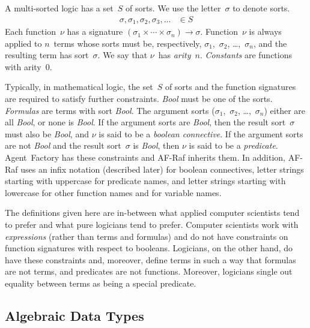 \documentclass[a4paper,12pt,oneside,fleqn]{book} %
\newcommand{\rg}[1]{\marginpar{\tiny\raggedright\textcolor{blue}{\bf rg:} #1}}
\begin{document}
A multi-sorted logic has a set~$S$ of sorts.  We use the letter~$\sigma$ to
denote sorts.
\begin{align}
\sigma, \sigma_1, \sigma_2, \sigma_3, \ldots &\in S
\end{align}
Each function~$\nu$ has a signature
$(\sigma_1\times\cdots\times\sigma_n)\to\sigma$.  Function~$\nu$ is always
applied to $n$~terms whose sorts must be, respectively,
$\sigma_1$,~$\sigma_2$, \dots,~$\sigma_n$, and the resulting term has
sort~$\sigma$. We say that $\nu$~has \emph{arity}~$n$. \emph{Constants} are
functions with arity~$0$.

Typically, in mathematical logic, the set~$S$ of sorts and the function
signatures are required to satisfy further constraints. \textit{Bool} must
be one of the sorts. \emph{Formulas} are terms with sort \textit{Bool}.
The argument sorts ($\sigma_1$,~$\sigma_2$, \dots,~$\sigma_n$) either are
all \textit{Bool}, or none is \textit{Bool}.  If the argument sorts are
\textit{Bool}, then the result sort~$\sigma$ must also be \textit{Bool},
and $\nu$ is said to be a \emph{boolean connective}.  If the argument sorts
are not \textit{Bool} and the result sort~$\sigma$ is \textit{Bool}, then
$\nu$ is said to be a \emph{predicate}.  Agent~Factory has these
constraints and AF-Raf inherits them. In addition, AF-Raf uses an infix
notation (described later) for boolean connectives, letter strings starting
with uppercase for predicate names, and letter strings starting with
lowercase for other function names and for variable names.

\begin{remark}
The definitions given here are in-between what applied computer scientists
tend to prefer and what pure logicians tend to prefer.  Computer scientists
work with \emph{expressions} (rather than terms and formulas) and do not
have constraints on function signatures with respect to booleans.
Logicians, on the other hand, do have these constraints and, moreover,
define terms in such a way that formulas are not terms, and predicates are
not functions. Moreover, logicians single out equality between terms as
being a special predicate.
\end{remark}

\subsection{Algebraic Data Types} %
\end{document}
